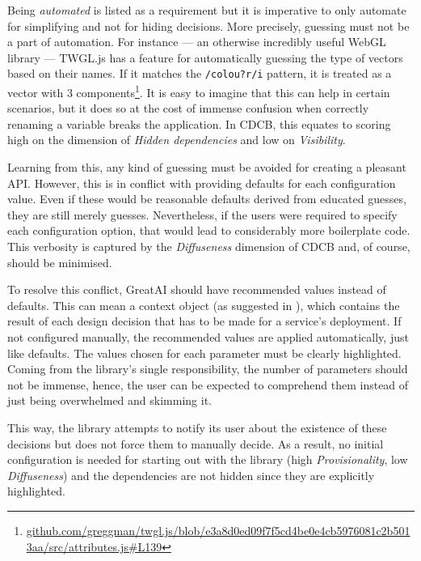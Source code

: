 Being \textit{automated} is listed as a requirement but it is imperative to only automate for simplifying and not for hiding decisions. More precisely, guessing must not be a part of automation. For instance --- an otherwise incredibly useful WebGL library --- TWGL.js has a feature for automatically guessing the type of vectors based on their names. If it matches the \texttt{/colou?r/i} pattern, it is treated as a vector with 3 components\footnote{\href{https://github.com/greggman/twgl.js/blob/e3a8d0ed09f7f5cd4be0e4cb5976081c2b5013aa/src/attributes.js\#L139}{\tiny github.com/greggman/twgl.js/blob/e3a8d0ed09f7f5cd4be0e4cb5976081c2b5013aa/src/attributes.js\#L139}}. It is easy to imagine that this can help in certain scenarios, but it does so at the cost of immense confusion when correctly renaming a variable breaks the application. In CDCB, this equates to scoring high on the dimension of \textit{Hidden dependencies} and low on \textit{Visibility}.

Learning from this, any kind of guessing must be avoided for creating a pleasant API. However, this is in conflict with providing defaults for each configuration value. Even if these would be reasonable defaults derived from educated guesses, they are still merely guesses. Nevertheless, if the users were required to specify each configuration option, that would lead to considerably more boilerplate code. This verbosity is captured by the \textit{Diffuseness} dimension of CDCB and, of course, should be minimised.

To resolve this conflict, GreatAI should have recommended values instead of defaults. This can mean a context object (as suggested in \cite{ousterhout2018philosophy}), which contains the result of each design decision that has to be made for a service's deployment. If not configured manually, the recommended values are applied automatically, just like defaults. The values chosen for each parameter must be clearly highlighted. Coming from the library's single responsibility, the number of parameters should not be immense, hence, the user can be expected to comprehend them instead of just being overwhelmed and skimming it.

This way, the library attempts to notify its user about the existence of these decisions but does not force them to manually decide. As a result, no initial configuration is needed for starting out with the library (high \textit{Provisionality}, low \textit{Diffuseness}) and the dependencies are not hidden since they are explicitly highlighted.

